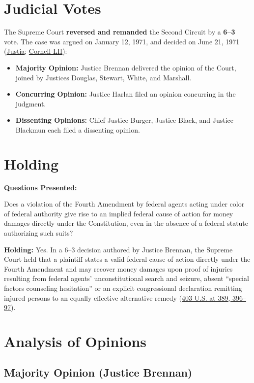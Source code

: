 \documentclass[12pt]{article}
\begin{document}
\section{Judicial Votes}
The Supreme Court \textbf{reversed and remanded} the Second Circuit by a \textbf{6--3} vote. The case was argued on January 12, 1971, and decided on June 21, 1971 (\href{https://supreme.justia.com/cases/federal/us/403/388/}{Justia}; \href{https://www.law.cornell.edu/supremecourt/text/403/388}{Cornell LII}):

\begin{itemize}
    \item \textbf{Majority Opinion:} Justice Brennan delivered the opinion of the Court, joined by Justices Douglas, Stewart, White, and Marshall.
    \item \textbf{Concurring Opinion:} Justice Harlan filed an opinion concurring in the judgment.
    \item \textbf{Dissenting Opinions:} Chief Justice Burger, Justice Black, and Justice Blackmun each filed a dissenting opinion.
\end{itemize}

\section{Holding}
\textbf{Questions Presented:}

Does a violation of the Fourth Amendment by federal agents acting under color of federal authority give rise to an implied federal cause of action for money damages directly under the Constitution, even in the absence of a federal statute authorizing such suits?

\textbf{Holding:} Yes. In a 6--3 decision authored by Justice Brennan, the Supreme Court held that a plaintiff states a valid federal cause of action directly under the Fourth Amendment and may recover money damages upon proof of injuries resulting from federal agents' unconstitutional search and seizure, absent ``special factors counseling hesitation'' or an explicit congressional declaration remitting injured persons to an equally effective alternative remedy (\href{https://supreme.justia.com/cases/federal/us/403/388/}{403 U.S. at 389, 396--97}).

\section{Analysis of Opinions}
\subsection{Majority Opinion (Justice Brennan)}
\end{document}
